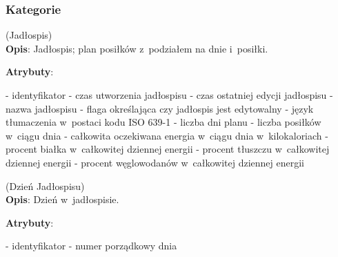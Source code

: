 \subsubsection{Kategorie}\label{subsubsec:database:mealplans:categories}
\begin{enumerate}[label={\textbf{KAT/4/\protect\twodigits{\theenumi}}}, wide, labelwidth=!, labelindent=0pt, labelsep=0pt, series=reqs]
    \setlength\itemsep{1.75em}
    \label{kat:MealPlan} (Jadłospis)\\
    \indent\textbf{Opis}: Jadłospis; plan posiłków z~podziałem na dnie i~posiłki.
    \par
    \textbf{Atrybuty}:
    \begin{itemize}[series=atr, wide, align=left, leftmargin=190pt]
        \label{kat:MealPlan:id}- identyfikator
        \label{kat:MealPlan:creationTimestamp}- czas utworzenia jadłospisu
        \label{kat:MealPlan:editTimestamp}- czas ostatniej edycji jadłospisu
        \label{kat:MealPlan:name}- nazwa jadłospisu
        \label{kat:MealPlan:isFinal}- flaga określająca czy jadłospis jest edytowalny
        \label{kat:MealPlan:language}- język tłumaczenia w~postaci kodu ISO 639-1
        \label{kat:MealPlan:numberOfDays}- liczba dni planu
        \label{kat:MealPlan:numberOfMealsPerDay}- liczba posiłków w~ciągu dnia
        \label{kat:MealPlan:totalDailyEnergy}- całkowita oczekiwana energia w~ciągu dnia w~kilokaloriach
        \label{kat:MealPlan:percentOfProtein}- procent białka w~całkowitej dziennej energii
        \label{kat:MealPlan:percentOfFat}- procent tłuszczu w~całkowitej dziennej energii
        \label{kat:MealPlan:percentOfCarbohydrates}- procent węglowodanów w~całkowitej dziennej energii
    \end{itemize}

    \label{kat:MealPlanDay} (Dzień Jadłospisu)\\
    \indent\textbf{Opis}: Dzień w~jadłospisie.
    \par
    \textbf{Atrybuty}:
    \begin{itemize}[series=atr, wide, align=left, leftmargin=190pt]
        \label{kat:MealPlanDay:id}- identyfikator
        \label{kat:MealPlanDay:ordinalNumber}- numer porządkowy dnia
    \end{itemize}


\end{enumerate}
